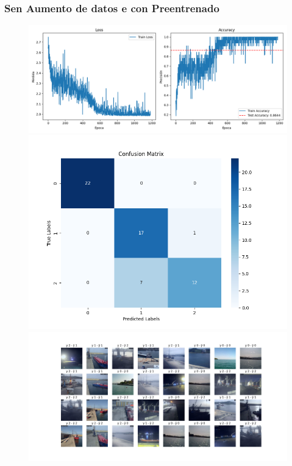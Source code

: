 \documentclass{article}
\begin{document}
\subsubsection{Sen Aumento de datos e con Preentrenado}
\begin{figure}[H]
    \centering
    \begin{minipage}{0.55\textwidth}
        \centering
        \includegraphics[width=\linewidth]{../figures/LOSS__A_False_P_True_D_True_MLP_True_efficientnet_b4.png}
    \end{minipage}
    \begin{minipage}{0.3\textwidth}
        \centering
        \includegraphics[width=\linewidth]{../figures/CM__A_False_P_True_D_True_MLP_True_efficientnet_b4.png}
    \end{minipage}
    \begin{minipage}{0.7\textwidth}
        \centering
        \includegraphics[width=\linewidth]{../figures/GRID__A_False_P_True_D_True_MLP_True_efficientnet_b4.png}
    \end{minipage}
\end{figure}
\end{document}
